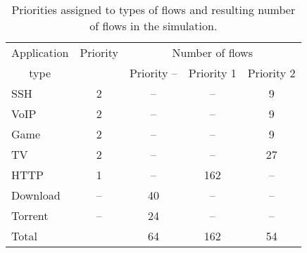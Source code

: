 \begin{table}
	\centering
	\begin{tabular}{@{}l|cccc@{}}
		\toprule
		\multicolumn{1}{c|}{Application} & Priority & \multicolumn{3}{c}{Number of flows}  \\
		\multicolumn{1}{c|}{type}        &          & Priority -- & Priority 1 & Priority 2 \\ \midrule
		SSH                              &    2     &     --      &     --      &     9      \\
		VoIP                             &    2     &     --      &     --      &     9      \\
		Game                             &    2     &     --      &     --      &     9      \\
		TV                               &    2     &     --      &     --      &     27     \\
		HTTP                             &    1     &     --      &    162     &     --      \\
		Download                         &    --     &     40     &     --      &     --      \\
		Torrent                          &    --     &     24     &     --      &     --      \\ \midrule
		Total                            &          &     64     &    162     &     54     \\ \bottomrule
	\end{tabular}

	\caption{Priorities assigned to types of flows and resulting number of flows in the simulation.}
	\label{tab:flows_count_A}
\end{table}